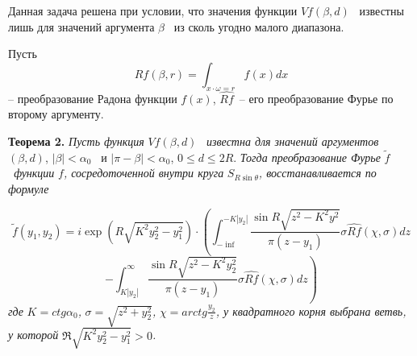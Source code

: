 Данная задача решена при условии, что значения функции  $\mathit{Vf}\left(\beta ,d\right)$ \ известны лишь для значений
аргумента  $\beta $ \ из сколь угодно малого диапазона.

Пусть
\begin{equation*}
\mathit{Rf}\left(\beta ,r\right)=\int _{x{\cdot}\omega =r}^{}f(x)\mathit{dx}
\end{equation*}
-- преобразование Радона функции  $f(x)$,  $\widehat {\mathit{Rf}}$\ – его преобразование Фурье по второму аргументу.

\textbf{Теорема 2.} \textit{Пусть функция}  $\mathit{Vf}\left(\beta ,d\right)$ \ \textit{известна для значений
	аргументов}  $\left(\beta ,d\right)$, $\left|\beta \right|<\alpha _0$ \ и  $\left|\pi -\beta \right|<\alpha
_0$, $0{\leq}d{\leq}2R$. \textit{Тогда преобразование Фурье } $\widetilde f$ \textit{\ функции } $f$\textit{,
	сосредоточенной внутри круга } $S_{R\sin \theta }$\textit{, восстанавливается по формуле}

\begin{equation*}
\widetilde f\left(y_1,y_2\right)=i\exp \left(R\sqrt{K^2y_2^2-y_1^2}\right){\cdot}\left(\int_{-\inf}^{-K\left|y_2\right|}\frac{\sin R \sqrt{z^2-K^2y^2}}{\pi(z - y_1)}\sigma\widehat{Rf}(\chi, \sigma)dz\right.
\end{equation*}
\begin{equation*}
\left.-\int _{K\left|y_2^{}\right|}^{{\infty}}\frac{\sin R\sqrt{z^2-K^2y_2^2}}{\pi \left(z-y_1\right)}\sigma \widehat
{\mathit{Rf}}\left(\chi ,\sigma \right)\mathit{dz}\right)
\end{equation*}
\textit{где } $K=\mathit{ctg}\alpha _0$\textit{, } $\sigma =\sqrt{z^2+y_2^2}$\textit{,} $\chi =\mathit{arctg}\frac{y_2}
z$\textit{, у квадратного корня выбрана ветвь, у которой } $\Re \sqrt{K^2y_2^2-y_1^2}>0$\textit{.} 